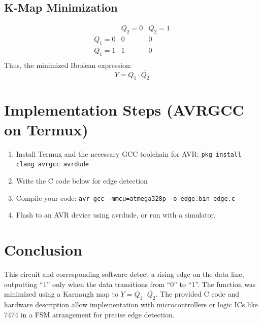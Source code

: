 \documentclass[12pt]{article}
\begin{document}
\subsection*{K-Map Minimization}

\[
\begin{array}{c|cc}
& Q_2=0 & Q_2=1 \\
\hline
Q_1=0 & 0 & 0 \\
Q_1=1 & 1 & 0 \\
\end{array}
\]
Thus, the minimized Boolean expression:
\[
Y = Q_1 \cdot \overline{Q_2}
\]

\section*{Implementation Steps (AVRGCC on Termux)}
\begin{enumerate}
    \item Install Termux and the necessary GCC toolchain for AVR: \texttt{pkg install clang avrgcc avrdude}
    \item Write the C code below for edge detection
    \item Compile your code: \texttt{avr-gcc -mmcu=atmega328p -o edge.bin edge.c}
    \item Flash to an AVR device using avrdude, or run with a simulator.
\end{enumerate}

\section*{Conclusion}

This circuit and corresponding software detect a rising edge on the data line, outputting ``1'' only when the data transitions from ``0'' to ``1''. The function was minimized using a Karnaugh map to \( Y = Q_1 \cdot \overline{Q_2} \). The provided C code and hardware description allow implementation with microcontrollers or logic ICs like 7474 in a FSM arrangement for precise edge detection.
\end{document}
